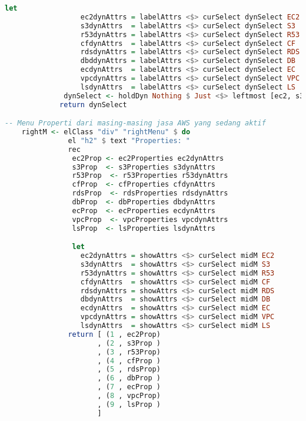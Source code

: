 \documentclass[pi.tex]{subfile}
\begin{document}
\begin{lstlisting}[language=Haskell]
              let
                  ec2dynAttrs = labelAttrs <$> curSelect dynSelect EC2
                  s3dynAttrs  = labelAttrs <$> curSelect dynSelect S3
                  r53dynAttrs = labelAttrs <$> curSelect dynSelect R53
                  cfdynAttrs  = labelAttrs <$> curSelect dynSelect CF
                  rdsdynAttrs = labelAttrs <$> curSelect dynSelect RDS
                  dbddynAttrs = labelAttrs <$> curSelect dynSelect DB
                  ecdynAttrs  = labelAttrs <$> curSelect dynSelect EC
                  vpcdynAttrs = labelAttrs <$> curSelect dynSelect VPC
                  lsdynAttrs  = labelAttrs <$> curSelect dynSelect LS
              dynSelect <- holdDyn Nothing $ Just <$> leftmost [ec2, s3, r53, cf, rds, db, ec, vpc, ls]
             return dynSelect

-- Menu Properti dari masing-masing jasa AWS yang sedang aktif
    rightM <- elClass "div" "rightMenu" $ do
               el "h2" $ text "Properties: "
               rec
                ec2Prop <- ec2Properties ec2dynAttrs
                s3Prop  <- s3Properties s3dynAttrs
                r53Prop  <- r53Properties r53dynAttrs
                cfProp  <- cfProperties cfdynAttrs
                rdsProp  <- rdsProperties rdsdynAttrs
                dbProp  <- dbProperties dbdynAttrs
                ecProp  <- ecProperties ecdynAttrs
                vpcProp  <- vpcProperties vpcdynAttrs
                lsProp  <- lsProperties lsdynAttrs

                let
                  ec2dynAttrs = showAttrs <$> curSelect midM EC2
                  s3dynAttrs  = showAttrs <$> curSelect midM S3
                  r53dynAttrs = showAttrs <$> curSelect midM R53
                  cfdynAttrs  = showAttrs <$> curSelect midM CF
                  rdsdynAttrs = showAttrs <$> curSelect midM RDS
                  dbdynAttrs  = showAttrs <$> curSelect midM DB
                  ecdynAttrs  = showAttrs <$> curSelect midM EC
                  vpcdynAttrs = showAttrs <$> curSelect midM VPC
                  lsdynAttrs  = showAttrs <$> curSelect midM LS
               return [ (1 , ec2Prop)
                      , (2 , s3Prop )
                      , (3 , r53Prop)
                      , (4 , cfProp )
                      , (5 , rdsProp)
                      , (6 , dbProp )
                      , (7 , ecProp )
                      , (8 , vpcProp)
                      , (9 , lsProp )
                      ]


\end{lstlisting}
\end{document}
